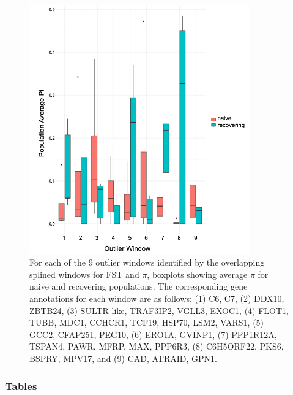 \documentclass[9pt,twoside,lineno]{pnas-new}
\begin{document}
\begin{figure}

{\centering \includegraphics[width=0.85\textwidth]{figures/boxplot_pi_by_windowpop.png}

}

\caption{\label{fig-boxplot-pi-by-windowpop}For each of the 9 outlier
windows identified by the overlapping splined windows for FST and
\(\pi\), boxplots showing average \(\pi\) for naive and recovering
populations. The corresponding gene annotations for each window are as
follows: (1) C6, C7, (2) DDX10, ZBTB24, (3) SULTR-like, TRAF3IP2, VGLL3,
EXOC1, (4) FLOT1, TUBB, MDC1, CCHCR1, TCF19, HSP70, LSM2, VARS1, (5)
GCC2, CFAP251, PEG10, (6) ERO1A, GVINP1, (7) PPP1R12A, TSPAN4, PAWR,
MFRP, MAX, PPP6R3, (8) C6H5ORF22, PKS6, BSPRY, MPV17, and (9) CAD,
ATRAID, GPN1.}

\end{figure}\clearpage

\newpage

\hypertarget{tables}{%
\subsubsection{Tables}\label{tables}}
\end{document}
